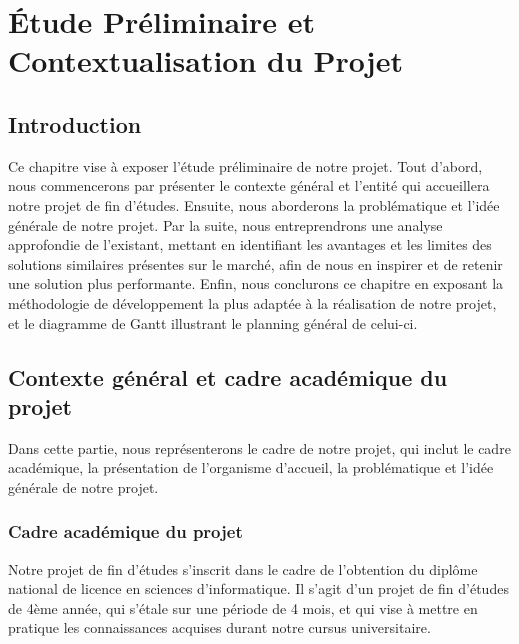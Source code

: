 \chapter{Étude Préliminaire et Contextualisation du Projet}

\section*{Introduction}
{Ce chapitre vise à exposer l'étude préliminaire de notre projet. Tout d'abord, nous commencerons par présenter le contexte général et l'entité qui accueillera notre projet de fin d'études. Ensuite, nous aborderons la problématique et l'idée générale de notre projet. Par la suite, nous entreprendrons une analyse approfondie de l'existant, mettant en identifiant les avantages et les limites des solutions similaires présentes sur le marché, afin de nous en inspirer et de retenir une solution plus performante. Enfin, nous conclurons ce chapitre en exposant la méthodologie de développement la plus adaptée à la réalisation de notre projet, et le diagramme de Gantt illustrant le planning général de celui-ci.}

\section{Contexte général et cadre académique du projet}
{Dans cette partie, nous représenterons le cadre de notre projet, qui inclut le cadre académique, la présentation de l'organisme d'accueil, la problématique et l'idée générale de notre projet.}

\subsection{Cadre académique du projet}
{Notre projet de fin d'études s'inscrit dans le cadre de l'obtention du diplôme national de licence en sciences d'informatique. Il s'agit d'un projet de fin d'études de 4ème année, qui s'étale sur une période de 4 mois, et qui vise à mettre en pratique les connaissances acquises durant notre cursus universitaire.}

